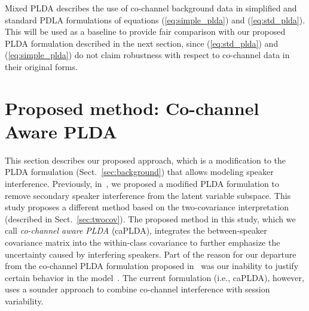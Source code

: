 \documentclass[journal]{IEEEtran}
\begin{document}
Mixed PLDA describes the use of co-channel background data in simplified and standard PDLA formulations of equations (\ref{eq:simple_plda}) and (\ref{eq:std_plda}). 
This will be used as a baseline to provide fair comparison with our proposed PLDA formulation described in the next section, since (\ref{eq:std_plda}) and (\ref{eq:simple_plda}) do not claim robustness with respect to co-channel data in their original forms. 


\section{Proposed method: Co-channel Aware PLDA}
\label{sec:cch_plda}
This section describes our proposed approach, which is a modification to the PLDA formulation (Sect.~\ref{sec:background}) that allows modeling speaker interference. 
Previously, in~\cite{shokouhi2015probabilistic}, we proposed a modified PLDA formulation to remove secondary speaker interference from the latent variable subspace. 
This study proposes a different method based on the two-covariance interpretation (described in Sect.~\ref{sec:twocov}). 
The proposed method in this study, which we call {\it co-channel aware PLDA} (caPLDA), integrates the between-speaker covariance matrix into the within-class covariance to further emphasize the uncertainty caused by interfering speakers. 
Part of the reason for our departure from the co-channel PLDA formulation proposed in~\cite{shokouhi2015probabilistic} was our inability to justify certain behavior in the model~\cite{navid_phd_thesis}. 
The current formulation (i.e., caPLDA), however, uses a sounder approach to combine co-channel interference with session variability. 
\end{document}
